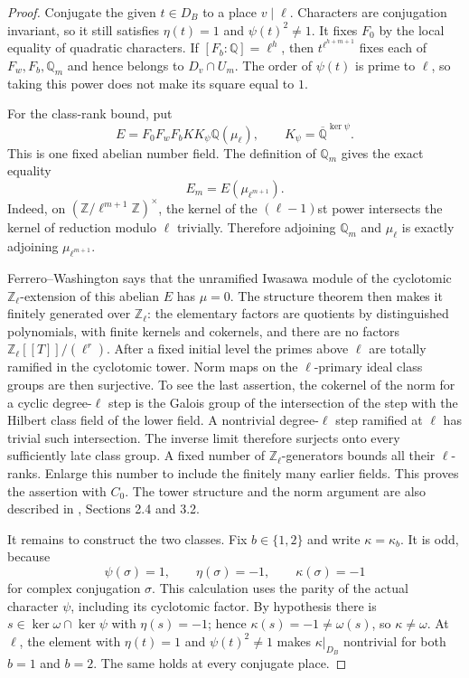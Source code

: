 \begin{proof}
Conjugate the given $t\in D_B$ to a place $v\mid\ell$.
Characters are conjugation invariant, so it still satisfies
$\eta(t)=1$ and $\psi(t)^2\ne1$.  It fixes $F_0$ by the
local equality of quadratic characters.  If $[F_b:\mathbb Q]
=\ell^h$, then $t^{\ell^{h+m+1}}$ fixes each of
$F_w,F_b,\mathbb Q_m$ and hence belongs to $D_v\cap U_m$.
The order of $\psi(t)$ is prime to $\ell$, so taking this
power does not make its square equal to $1$.

For the class-rank bound, put
\[
 E=F_0F_wF_bK K_\psi\mathbb Q(\mu_\ell),
 \qquad K_\psi=\overline{\mathbb Q}^{\ker\psi}.
\]
This is one fixed abelian number field.  The definition of
$\mathbb Q_m$ gives the exact equality
\[
 E_m=E(\mu_{\ell^{m+1}}).                                \tag{AT3}
\]
Indeed, on $(\mathbb Z/\ell^{m+1}\mathbb Z)^\times$, the
kernel of the $(\ell-1)$st power intersects the kernel of
reduction modulo $\ell$ trivially.  Therefore adjoining
$\mathbb Q_m$ and $\mu_\ell$ is exactly adjoining
$\mu_{\ell^{m+1}}$.

Ferrero--Washington says that the unramified Iwasawa module
of the cyclotomic $\mathbb Z_\ell$-extension of this abelian
$E$ has $\mu=0$\cite{AuxTowerFW}.  The structure theorem
then makes it finitely generated over $\mathbb Z_\ell$:
the elementary factors are quotients by distinguished
polynomials, with finite kernels and cokernels, and there
are no factors $\mathbb Z_\ell[[T]]/(\ell^r)$.
After a fixed initial level the primes above $\ell$ are
totally ramified in the cyclotomic tower.  Norm maps on the
$\ell$-primary ideal class groups are then surjective.
To see the last assertion, the cokernel of the norm for a
cyclic degree-$\ell$ step is the Galois group of the
intersection of the step with the Hilbert class field of
the lower field.  A nontrivial degree-$\ell$ step ramified
at $\ell$ has trivial such intersection.  The inverse limit
therefore surjects onto every sufficiently late class group.
A fixed number of $\mathbb Z_\ell$-generators bounds all their
$\ell$-ranks.  Enlarge this number to include the finitely
many earlier fields.  This proves the assertion with $C_0$.
The tower structure and the norm argument are also described
in \cite{AuxTowerIwasawa}, Sections 2.4 and 3.2.

It remains to construct the two classes.  Fix $b\in\{1,2\}$
and write $\kappa=\kappa_b$.  It is odd, because
\[
 \psi(\sigma)=1,\qquad \eta(\sigma)=-1,
 \qquad \kappa(\sigma)=-1                               \tag{AT4}
\]
for complex conjugation $\sigma$.  This calculation uses
the parity of the actual character $\psi$, including its
cyclotomic factor.  By hypothesis there is
$s\in\ker\omega\cap\ker\psi$ with $\eta(s)=-1$; hence
$\kappa(s)=-1\ne\omega(s)$, so $\kappa\ne\omega$.
At $\ell$, the element with $\eta(t)=1$ and
$\psi(t)^2\ne1$ makes $\kappa|_{D_B}$ nontrivial for both
$b=1$ and $b=2$.  The same holds at every conjugate place.


\end{proof}
